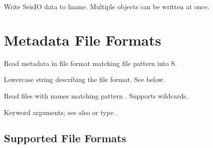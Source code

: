\documentclass[letterpaper,11pt,english]{sphinxmanual}
\begin{document}

\begin{fulllineitems}
\end{fulllineitems}


Write SeisIO data to fname. Multiple objects can be written at once.


\section{Metadata File Formats}
\label{\detokenize{src/Formats/metadata:metadata-file-formats}}\label{\detokenize{src/Formats/metadata::doc}}

\begin{fulllineitems}
\end{fulllineitems}



\begin{fulllineitems}
\end{fulllineitems}


\begin{DUlineblock}{0em}
\item[] Read metadata in file format  matching file pattern  into S.
\item[] 
\item[] 
\item[] Lowercase string describing the file format. See below.
\item[] 
\item[] 
\item[] Read files with names matching pattern . Supports wildcards.
\item[] 
\item[] 
\item[] Keyword arguments; see also {\hyperref[\detokenize{src/Appendices/keywords:dkw}]{}} or type .
\end{DUlineblock}


\subsection{Supported File Formats}
\label{\detokenize{src/Formats/metadata:supported-file-formats}}
\end{document}
